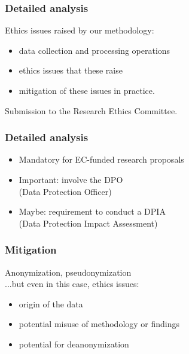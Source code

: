 \documentclass[17pt,aspectratio=169,hyperref={pdfusetitle,colorlinks,allcolors=olive}]{beamer}
\begin{document}
\begin{frame}[fragile]
  \frametitle{Detailed analysis}

  Ethics issues raised by our methodology:

  \begin{itemize}
  \item data collection and processing operations
  \item ethics issues that these raise
  \item mitigation of these issues in practice.
  \end{itemize}

  Submission to the Research Ethics Committee.
\end{frame}

\begin{frame}[fragile]
  \frametitle{Detailed analysis}

  \begin{itemize}
  \item Mandatory for EC-funded research proposals

  \item Important: involve the DPO \\
  (Data Protection Officer)

  \item Maybe: requirement to conduct a DPIA \\
    (Data Protection Impact Assessment)
  \end{itemize}
\end{frame}

\begin{frame}[fragile]
  \frametitle{Mitigation}

  Anonymization, pseudonymization \\
  \vspace{.5cm}
  ...but even in this case, ethics issues: \\

  \begin{itemize}
  \item origin of the data
  \item potential misuse of methodology or findings
  \item potential for deanonymization
  \end{itemize}
\end{frame}

\end{document}
